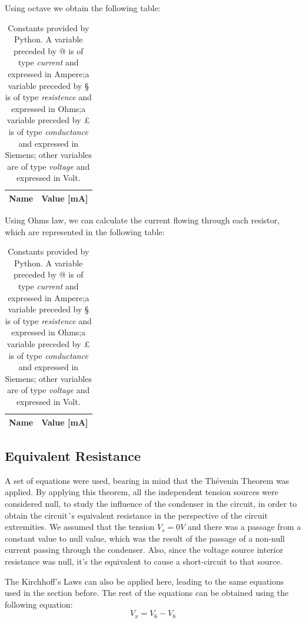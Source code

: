 Using octave we obtain the following table:
\begin{table}[!h]
	\centering
	\begin{tabular}{|l|r|}
		\hline    
		{\bf Name} & {\bf Value [mA]} \\ \hline
		
	\end{tabular}
	\caption{Constants provided by Python. A variable preceded by @ is of type {\em current}
		and expressed in Ampere;a variable preceded by § is of type {\it resistence} and expressed in
		Ohms;a variable preceded by £ is of type {\it conductance} and expressed in
		Siemens; other variables are of type {\it voltage} and expressed in
		Volt.}
	\label{tab:op}
\end{table}

Using Ohms law, we can calculate the current flowing through each resistor, which are represented in the following table:
 \begin{table}[!h]
 	\centering
 	\begin{tabular}{|l|r|}
 		\hline    
 		{\bf Name} & {\bf Value [mA]} \\ \hline
 		
 	\end{tabular}
 	\caption{Constants provided by Python. A variable preceded by @ is of type {\em current}
 		and expressed in Ampere;a variable preceded by § is of type {\it resistence} and expressed in
 		Ohms;a variable preceded by £ is of type {\it conductance} and expressed in
 		Siemens; other variables are of type {\it voltage} and expressed in
 		Volt.}
 	\label{tab:op}
 \end{table}
 

\subsection{Equivalent Resistance}
A set of equations were used, bearing in mind that the Thévenin Theorem was applied. By applying this theorem, all the independent tension sources were considered null, to study the influence of the condenser in the circuit, in order to obtain the circuit´s equivalent resistance in the perspective of the circuit extremities. We assumed that the tension $V_s = 0V$ and there was a passage from a constant value to null value, which was the result of the passage of a non-null current passing through the condenser. Also, since the voltage source interior resistance was null, it's the equivalent to cause a short-circuit to that source.

The Kirchhoff's Laws can also be applied here, leading to the same equations used in the section before. The rest of the equations can be obtained using the following equation:
\begin{equation}
	V_x = V_6 - V_8
\end{equation}

